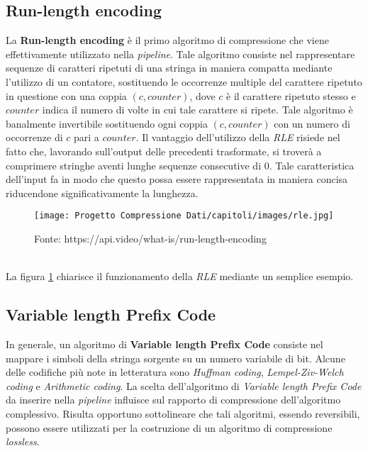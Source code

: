 \begin{enumerate}
\subsection{Run-length encoding} \label{section:rle}
La \textbf{Run-length encoding} è il primo algoritmo di compressione che viene effettivamente utilizzato nella \emph{pipeline}. Tale algoritmo consiste nel rappresentare sequenze di caratteri ripetuti di una stringa in maniera compatta mediante l'utilizzo di un contatore, sostituendo le occorrenze multiple del carattere ripetuto in questione con una coppia $(c, counter)$, dove $c$ è il carattere ripetuto stesso e $counter$ indica il numero di volte in cui tale carattere si ripete. Tale algoritmo è banalmente invertibile sostituendo ogni coppia $(c, counter)$ con un numero di occorrenze di $c$ pari a $counter$. Il vantaggio dell'utilizzo della \emph{RLE} risiede nel fatto che, lavorando sull'output delle precedenti trasformate, si troverà a comprimere stringhe aventi lunghe sequenze consecutive di $0$. Tale caratteristica dell'input fa in modo che questo possa essere rappresentata in maniera concisa riducendone significativamente la lunghezza.  
\begin{figure}[h]
    \centering
    \texttt{[image: Progetto Compressione Dati/capitoli/images/rle.jpg]}
\caption{Fonte: https://api.video/what-is/run-length-encoding}
    \label{fig:rle}
\end{figure} \\
La figura \ref{fig:rle} chiarisce il funzionamento della \emph{RLE} mediante un semplice esempio.
\subsection{Variable length Prefix Code} 
In generale, un algoritmo di \textbf{Variable length Prefix Code} consiste nel mappare i simboli della stringa sorgente su un numero variabile di bit. Alcune delle codifiche più note in letteratura sono \emph{Huffman coding}, \emph{Lempel-Ziv-Welch coding} e \emph{Arithmetic coding}. La scelta dell'algoritmo di \emph{Variable length Prefix Code} da inserire nella \emph{pipeline} influisce sul rapporto di compressione dell'algoritmo complessivo. Risulta opportuno sottolineare che tali algoritmi, essendo reversibili, possono essere utilizzati per la costruzione di un algoritmo di compressione \emph{lossless}.  

\end{enumerate}
